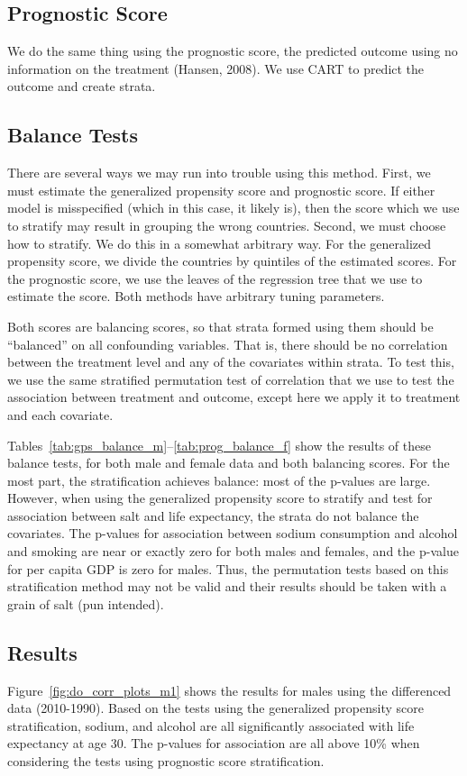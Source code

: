 \documentclass[11pt]{article}\usepackage[]{graphicx}\usepackage[]{color}
\begin{document}
\subsection{Prognostic Score}
We do the same thing using the prognostic score, the predicted outcome using no information on the treatment (Hansen, 2008).
We use CART to predict the outcome and create strata.

\subsection{Balance Tests}
There are several ways we may run into trouble using this method.
First, we must estimate the generalized propensity score and prognostic score.
If either model is misspecified (which in this case, it likely is), then the score which we use to stratify may result in grouping the wrong countries.
Second, we must choose how to stratify.
We do this in a somewhat arbitrary way.
For the generalized propensity score, we divide the countries by quintiles of the estimated scores.
For the prognostic score, we use the leaves of the regression tree that we use to estimate the score.
Both methods have arbitrary tuning parameters.

Both scores are balancing scores, so that strata formed using them should be ``balanced'' on all confounding variables.
That is, there should be no correlation between the treatment level and any of the covariates within strata.
To test this, we use the same stratified permutation test of correlation that we use to test the association between treatment and outcome, except here we apply it to treatment and each covariate.

Tables~\ref{tab:gps_balance_m}--\ref{tab:prog_balance_f} show the results of these balance tests, for both male and female data and both balancing scores.
For the most part, the stratification achieves balance: most of the p-values are large.
However, when using the generalized propensity score to stratify and test for association between salt and life expectancy, the strata do not balance the covariates.
The p-values for association between sodium consumption and alcohol and smoking are near or exactly zero for both males and females, and the p-value for per capita GDP is zero for males.
Thus, the permutation tests based on this stratification method may not be valid and their results should be taken with a grain of salt (pun intended).

\subsection{Results}
Figure~\ref{fig:do_corr_plots_m1} shows the results for males using the differenced data (2010-1990).
Based on the tests using the generalized propensity score stratification, sodium, and alcohol are all significantly associated with life expectancy at age 30.
The p-values for association are all above 10\% when considering the tests using prognostic score stratification.
\end{document}
